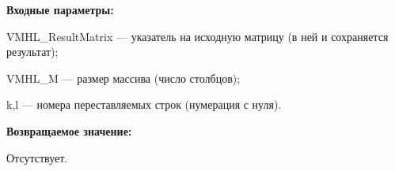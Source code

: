 \textbf{Входные параметры:}  
 
VMHL\_ResultMatrix --- указатель на исходную матрицу (в ней и сохраняется результат);
 
VMHL\_M --- размер массива (число столбцов);
 
k,l --- номера переставляемых строк (нумерация с нуля).

\textbf{Возвращаемое значение:}

Отсутствует.